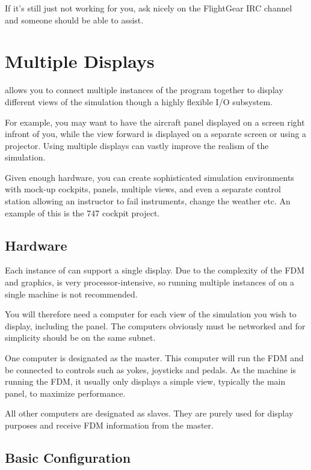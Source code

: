 If it's still just not working for you, ask nicely on the FlightGear IRC channel and someone should be able to assist. 

\section{Multiple Displays}

\FlightGear{} allows you to connect multiple instances of the program together
to display different views of the simulation though a highly flexible I/O
subsystem.

For example, you may want to have the aircraft panel displayed on a screen
right infront of you, while the view forward is displayed on a separate screen
or using a projector. Using multiple displays can vastly improve the realism
of the simulation.

Given enough hardware, you can create sophisticated simulation environments
with mock-up cockpits, panels, multiple views, and even a separate control
station allowing an
instructor to fail instruments, change the weather etc. An example of this is
the 747 cockpit project.


\noindent
{}

\subsection{Hardware}

Each instance of \FlightGear{} can support a single display. Due to the
complexity of the FDM and graphics, \FlightGear{} is very processor-intensive,
so running multiple instances of \FlightGear{} on a single machine is not
recommended.

You will therefore need a computer for each view of the simulation you wish
to display, including the panel. The computers obviously must be networked
and for simplicity should be on the same subnet.

One computer is designated as the master. This computer will run the FDM and
be connected to controls such as yokes, joysticks and pedals. As the machine is
running the FDM, it usually only displays a simple view, typically the main
panel, to maximize performance.

All other computers are designated as slaves. They are purely used for display
purposes and receive FDM information from the master.

\subsection{Basic Configuration}

